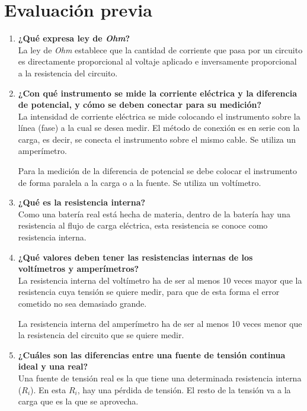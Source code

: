 \documentclass[letter,11pt]{article}
\begin{document}
\section{Evaluación previa}
\begin{enumerate}
\item \textbf{¿Qué expresa ley de \emph{Ohm}?} \\
La ley de \emph{Ohm} establece que la cantidad de corriente que pasa por un
circuito es directamente proporcional al voltaje aplicado e inversamente
proporcional a la resistencia del circuito.

\item \textbf{¿Con qué instrumento se mide la corriente eléctrica y la
diferencia de potencial, y cómo se deben conectar para su medición?} \\
La intensidad de corriente eléctrica se mide colocando el instrumento sobre la
línea (fase) a la cual se desea medir. El método de conexión es en serie con la
carga, es decir, se conecta el instrumento sobre el mismo cable. Se utiliza un
amperímetro.

Para la medición de la diferencia de potencial se debe colocar el instrumento de
forma paralela a la carga o a la fuente. Se utiliza un voltímetro.

\item \textbf{¿Qué es la resistencia interna?} \\
Como una batería real está hecha de materia, dentro de la batería hay una
resistencia al flujo de carga eléctrica, esta resistencia se conoce como
resistencia interna.

\item \textbf{¿Qué valores deben tener las resistencias internas de los
voltímetros y amperímetros?} \\
La resistencia interna del voltímetro ha de ser al menos 10 veces mayor que la
resistencia cuya tensión se quiere medir, para que de esta forma el error
cometido no sea demasiado grande.

La resistencia interna del amperímetro ha de ser al menos 10 veces menor que la
resistencia del circuito que se quiere medir.

\item \textbf{¿Cuáles son las diferencias entre una fuente de tensión continua
ideal y una real?} \\
Una fuente de tensión real es la que tiene una determinada resistencia interna
($R_{i}$). En esta $R_{i}$, hay una pérdida de tensión. El resto de la
tensión va a la carga que es la que se aprovecha.


\end{enumerate}
\end{document}
